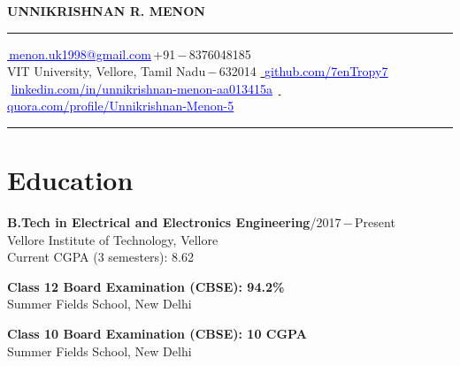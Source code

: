 \documentclass[a4paper, 12pt]{article}
\begin{document}
    \begin{center}
        \Huge{\textbf{UNNIKRISHNAN R. MENON}}
    \end{center}
    
    \noindent\rule{\textwidth}{1pt}
    \faEnvelope\href{menon.uk1998@gmail.com}{\textcolor{blue}{\,\underline{menon.uk1998@gmail.com}}}\qquad\qquad\qquad\qquad\qquad\faPhone\,+91\,$-$\,8376048185\\
        \faMapMarker* VIT University, Vellore, Tamil Nadu\,$-$\,632014\quad\,\,\faGithub\href{github.com/7enTropy7}{\textcolor{blue}{\,\,\underline{github.com/7enTropy7}}}\\
        \faLinkedin\,\,\href{linkedin.com/in/unnikrishnan-menon-aa013415a}{\textcolor{blue}{\underline{linkedin.com/in/unnikrishnan-menon-aa013415a}}}\,\,\,\faQuora\href{quora.com/profile/Unnikrishnan-Menon-5}{\textcolor{blue}{\,\underline{quora.com/profile/Unnikrishnan-Menon-5}}}\\
        \noindent\rule{\textwidth}{1pt}
        
        \section*{Education}
        \begin{flushleft}
        \textbf{B.Tech in Electrical and Electronics Engineering}\qquad\qquad\qquad{}/2017\,$-$\,Present\\
        Vellore Institute of Technology, Vellore\\ Current CGPA (3 semesters): 8.62
    \end{flushleft}
    
    \begin{flushleft}
        \textbf{Class 12 Board Examination (CBSE): 94.2\%}\qquad\qquad\qquad\qquad{}\\Summer Fields School, New Delhi
    \end{flushleft}
    
    \begin{flushleft}
        \textbf{Class 10 Board Examination (CBSE): 10 CGPA}\qquad\qquad\qquad{}\\Summer Fields School, New Delhi
    \end{flushleft}
    
\end{document}
